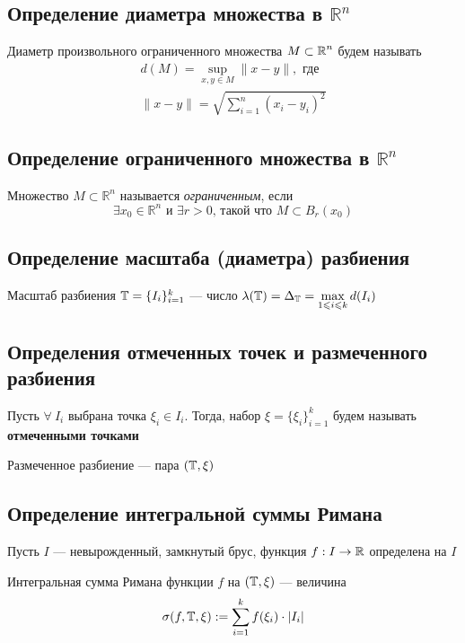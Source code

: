 \documentclass[a4paper]{article}
\begin{document}
\subsection{Определение диаметра множества в $\mathbb{R}^n$}
 Диаметр произвольного ограниченного множества $M\subset\operatorname{\mathbb{R}}^n$ будем называть 
\begin{equation*}
\begin{aligned}
    d(M) = \displaystyle\sup_{x,y\in M}\|x-y\|,\text{ где}\\
    \|x-y\|=\sqrt{\sum_{i=1}^{n}\left(x_i-y_i\right)^2}
\end{aligned}
\end{equation*}

\subsection{Определение ограниченного множества в $\mathbb{R}^n$}
 Множество $M\subset \mathbb{R}^n$ называется \textit{ограниченным}, если $$\exists x_0\in\mathbb{R}^n\text{ и }\exists r>0\text{, такой что }M\subset B_{r}(x_0)$$

\subsection{Определение масштаба (диаметра) разбиения}
 Масштаб разбиения $\operatorname{\mathbb{T}}=\{I_i\}_{i=1}^k$ — число $\lambda(\operatorname{\mathbb{T}}) = \Delta_{\operatorname{\mathbb{T}}} = \displaystyle\max_{1\leqslant i\leqslant k} d(I_i)$

\subsection{Определения отмеченных точек и размеченного разбиения}
 Пусть $\forall\ I_i$ выбрана точка $\xi_i\in I_i$. Тогда, набор $\xi = \{\xi_i\}_{i=1}^k$ будем называть \textbf{отмеченными точками}

 Размеченное разбиение — пара $(\operatorname{\mathbb{T}}, \xi)$

\subsection{Определение интегральной суммы Римана}
Пусть $I$ — невырожденный, замкнутый брус, функция $f: I\rightarrow \operatorname{\mathbb{R}}$ определена на $I$

 \label{1.8} Интегральная сумма Римана функции $f$ на $(\operatorname{\mathbb{T}}, \xi)$ — величина
$$\sigma(f, \T, \xi) := \sum_{i=1}^kf(\xi_i)\cdot|I_i|$$
\end{document}
